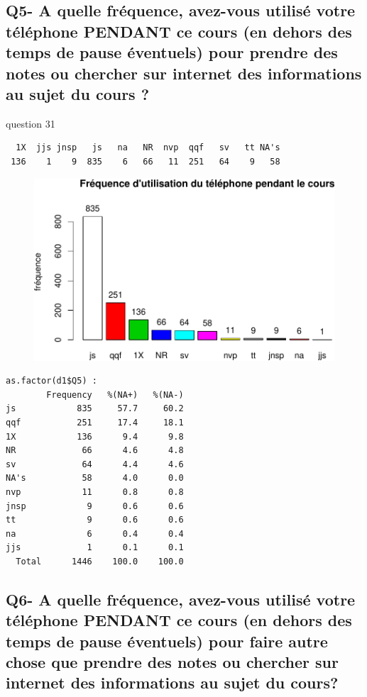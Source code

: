 \documentclass[]{article}
\begin{document}
\subsection{Q5- A quelle fréquence, avez-vous utilisé votre téléphone
PENDANT ce cours (en dehors des temps de pause éventuels) pour prendre
des notes ou chercher sur internet des informations au sujet du cours
?}\label{q5--a-quelle-frequence-avez-vous-utilise-votre-telephone-pendant-ce-cours-en-dehors-des-temps-de-pause-eventuels-pour-prendre-des-notes-ou-chercher-sur-internet-des-informations-au-sujet-du-cours}

question 31

\begin{verbatim}
  1X  jjs jnsp   js   na   NR  nvp  qqf   sv   tt NA's 
 136    1    9  835    6   66   11  251   64    9   58 
\end{verbatim}

\begin{figure}[htbp]
\centering
\includegraphics{qs_etudiants_files/figure-latex/utilisation-1.pdf}
\end{figure}

\begin{verbatim}
as.factor(d1$Q5) : 
        Frequency   %(NA+)   %(NA-)
js            835     57.7     60.2
qqf           251     17.4     18.1
1X            136      9.4      9.8
NR             66      4.6      4.8
sv             64      4.4      4.6
NA's           58      4.0      0.0
nvp            11      0.8      0.8
jnsp            9      0.6      0.6
tt              9      0.6      0.6
na              6      0.4      0.4
jjs             1      0.1      0.1
  Total      1446    100.0    100.0
\end{verbatim}

\subsection{Q6- A quelle fréquence, avez-vous utilisé votre téléphone
PENDANT ce cours (en dehors des temps de pause éventuels) pour faire
autre chose que prendre des notes ou chercher sur internet des
informations au sujet du
cours?}\label{q6--a-quelle-frequence-avez-vous-utilise-votre-telephone-pendant-ce-cours-en-dehors-des-temps-de-pause-eventuels-pour-faire-autre-chose-que-prendre-des-notes-ou-chercher-sur-internet-des-informations-au-sujet-du-cours}
\end{document}
